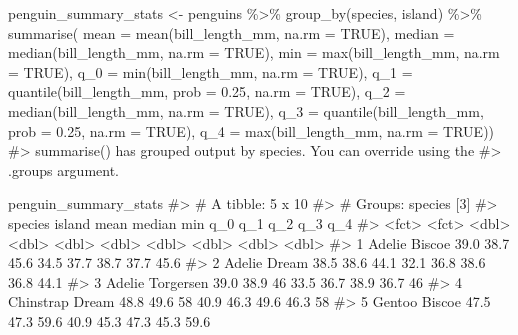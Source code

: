 \documentclass[
  letterpaper,
  DIV=11,
  numbers=noendperiod]{scrreprt}
\newenvironment{Shaded}{\begin{snugshade}}{\end{snugshade}}
\newcommand{\AttributeTok}[1]{\textcolor[rgb]{0.40,0.45,0.13}{#1}}
\newcommand{\CommentTok}[1]{\textcolor[rgb]{0.37,0.37,0.37}{#1}}
\newcommand{\ConstantTok}[1]{\textcolor[rgb]{0.56,0.35,0.01}{#1}}
\newcommand{\FloatTok}[1]{\textcolor[rgb]{0.68,0.00,0.00}{#1}}
\newcommand{\FunctionTok}[1]{\textcolor[rgb]{0.28,0.35,0.67}{#1}}
\newcommand{\NormalTok}[1]{\textcolor[rgb]{0.00,0.23,0.31}{#1}}
\newcommand{\OtherTok}[1]{\textcolor[rgb]{0.00,0.23,0.31}{#1}}
\newcommand{\SpecialCharTok}[1]{\textcolor[rgb]{0.37,0.37,0.37}{#1}}
\begin{document}
\begin{Shaded}
\begin{Highlighting}[]
\NormalTok{penguin\_summary\_stats }\OtherTok{\textless{}{-}}\NormalTok{ penguins }\SpecialCharTok{\%\textgreater{}\%} 
  \FunctionTok{group\_by}\NormalTok{(species, island) }\SpecialCharTok{\%\textgreater{}\%}
  \FunctionTok{summarise}\NormalTok{(}
    \AttributeTok{mean =} \FunctionTok{mean}\NormalTok{(bill\_length\_mm, }\AttributeTok{na.rm =} \ConstantTok{TRUE}\NormalTok{),}
    \AttributeTok{median =} \FunctionTok{median}\NormalTok{(bill\_length\_mm, }\AttributeTok{na.rm =} \ConstantTok{TRUE}\NormalTok{),}
    \AttributeTok{min =} \FunctionTok{max}\NormalTok{(bill\_length\_mm, }\AttributeTok{na.rm =} \ConstantTok{TRUE}\NormalTok{),}
    \AttributeTok{q\_0 =} \FunctionTok{min}\NormalTok{(bill\_length\_mm, }\AttributeTok{na.rm =} \ConstantTok{TRUE}\NormalTok{),}
    \AttributeTok{q\_1 =} \FunctionTok{quantile}\NormalTok{(bill\_length\_mm, }\AttributeTok{prob =} \FloatTok{0.25}\NormalTok{, }\AttributeTok{na.rm =} \ConstantTok{TRUE}\NormalTok{),}
    \AttributeTok{q\_2 =} \FunctionTok{median}\NormalTok{(bill\_length\_mm, }\AttributeTok{na.rm =} \ConstantTok{TRUE}\NormalTok{),}
    \AttributeTok{q\_3 =} \FunctionTok{quantile}\NormalTok{(bill\_length\_mm, }\AttributeTok{prob =} \FloatTok{0.25}\NormalTok{, }\AttributeTok{na.rm =} \ConstantTok{TRUE}\NormalTok{),}
    \AttributeTok{q\_4 =} \FunctionTok{max}\NormalTok{(bill\_length\_mm, }\AttributeTok{na.rm =} \ConstantTok{TRUE}\NormalTok{))}
\CommentTok{\#\textgreater{} \textasciigrave{}summarise()\textasciigrave{} has grouped output by \textquotesingle{}species\textquotesingle{}. You can override using the}
\CommentTok{\#\textgreater{} \textasciigrave{}.groups\textasciigrave{} argument.}

\NormalTok{penguin\_summary\_stats}
\CommentTok{\#\textgreater{} \# A tibble: 5 x 10}
\CommentTok{\#\textgreater{} \# Groups:   species [3]}
\CommentTok{\#\textgreater{}   species   island     mean median   min   q\_0   q\_1   q\_2   q\_3   q\_4}
\CommentTok{\#\textgreater{}   \textless{}fct\textgreater{}     \textless{}fct\textgreater{}     \textless{}dbl\textgreater{}  \textless{}dbl\textgreater{} \textless{}dbl\textgreater{} \textless{}dbl\textgreater{} \textless{}dbl\textgreater{} \textless{}dbl\textgreater{} \textless{}dbl\textgreater{} \textless{}dbl\textgreater{}}
\CommentTok{\#\textgreater{} 1 Adelie    Biscoe     39.0   38.7  45.6  34.5  37.7  38.7  37.7  45.6}
\CommentTok{\#\textgreater{} 2 Adelie    Dream      38.5   38.6  44.1  32.1  36.8  38.6  36.8  44.1}
\CommentTok{\#\textgreater{} 3 Adelie    Torgersen  39.0   38.9  46    33.5  36.7  38.9  36.7  46  }
\CommentTok{\#\textgreater{} 4 Chinstrap Dream      48.8   49.6  58    40.9  46.3  49.6  46.3  58  }
\CommentTok{\#\textgreater{} 5 Gentoo    Biscoe     47.5   47.3  59.6  40.9  45.3  47.3  45.3  59.6}
\end{Highlighting}
\end{Shaded}
\end{document}
